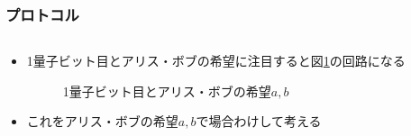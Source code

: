 \begin{frame}
  \frametitle{プロトコル}

  \begin{columns}
    \begin{column}{0.5\textwidth}
    \end{column}
    \begin{column}{0.5\textwidth}
      \pause
    \end{column}
  \end{columns}

  \pause
  \begin{itemize}
    \item 1量子ビット目とアリス・ボブの希望に注目すると図\ref{fig:1st_qubit}の回路になる
    \begin{figure}
      \centering
      \caption{1量子ビット目とアリス・ボブの希望$a, b$}
      \label{fig:1st_qubit}
    \end{figure}

    \item<+-> これをアリス・ボブの希望$a, b$で場合わけして考える
  \end{itemize}
\end{frame}

